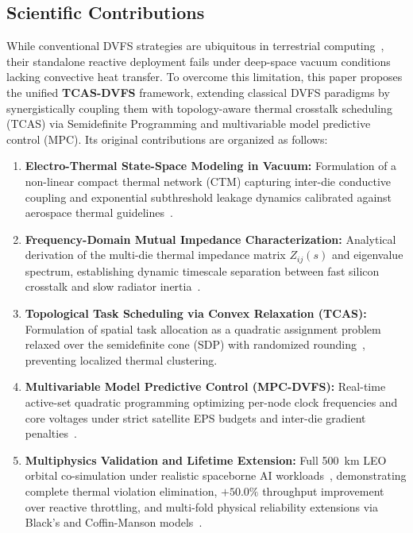 \documentclass[journal]{IEEEtran}
\begin{document}
\subsection{Scientific Contributions}
While conventional DVFS strategies are ubiquitous in terrestrial computing~\cite{brooks2001dtm, skadron2004hotspot, hoffmann2021online}, their standalone reactive deployment fails under deep-space vacuum conditions lacking convective heat transfer. To overcome this limitation, this paper proposes the unified \textbf{TCAS-DVFS} framework, extending classical DVFS paradigms by synergistically coupling them with topology-aware thermal crosstalk scheduling (TCAS) via Semidefinite Programming and multivariable model predictive control (MPC). Its original contributions are organized as follows:
\begin{enumerate}
    \item \textbf{Electro-Thermal State-Space Modeling in Vacuum:} Formulation of a non-linear compact thermal network (CTM) capturing inter-die conductive coupling and exponential subthreshold leakage dynamics calibrated against aerospace thermal guidelines~\cite{nasa2022handbook, ecss2008thermal}.
    \item \textbf{Frequency-Domain Mutual Impedance Characterization:} Analytical derivation of the multi-die thermal impedance matrix $Z_{ij}(s)$ and eigenvalue spectrum, establishing dynamic timescale separation between fast silicon crosstalk and slow radiator inertia~\cite{murali2007convex, wang2025packaging}.
    \item \textbf{Topological Task Scheduling via Convex Relaxation (TCAS):} Formulation of spatial task allocation as a quadratic assignment problem relaxed over the semidefinite cone (SDP) with randomized rounding~\cite{boyd2004convex, ge2010distributed}, preventing localized thermal clustering.
    \item \textbf{Multivariable Model Predictive Control (MPC-DVFS):} Real-time active-set quadratic programming optimizing per-node clock frequencies and core voltages under strict satellite EPS budgets and inter-die gradient penalties~\cite{yuan2025heat, hoffmann2021online}.
    \item \textbf{Multiphysics Validation and Lifetime Extension:} Full 500~km LEO orbital co-simulation under realistic spaceborne AI workloads~\cite{giuffrida2021phisat1, sherwood2003ase}, demonstrating complete thermal violation elimination, $+50.0\%$ throughput improvement over reactive throttling, and multi-fold physical reliability extensions via Black's and Coffin-Manson models~\cite{black1969electromigration, manson1966fatigue}.
\end{enumerate}
\end{document}
